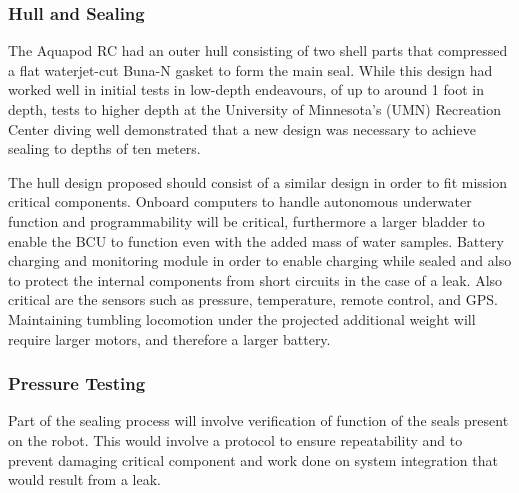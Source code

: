 


	\subsubsection{Hull and Sealing}

	The Aquapod RC had an outer hull consisting of two shell parts that compressed a flat waterjet-cut Buna-N gasket to form the main seal. While this design had worked well in initial tests in low-depth endeavours, of up to around 1 foot in depth, tests to higher depth at the University of Minnesota's (UMN) Recreation Center diving well demonstrated that a new design was necessary to achieve sealing to depths of ten meters. 

	The hull design proposed should consist of a similar design in order to fit mission critical components. Onboard computers to handle autonomous underwater function and programmability will be critical, furthermore a larger bladder to enable the BCU to function even with the added mass of water samples. Battery charging and monitoring module in order to enable charging while sealed and also to protect the internal components from short circuits in the case of a leak. Also critical are the sensors such as pressure, temperature, remote control, and GPS. Maintaining tumbling locomotion under the projected additional weight will require larger motors, and therefore a larger battery. 

	\subsubsection{Pressure Testing}
	Part of the sealing process will involve verification of function of the seals present on the robot. This would involve a protocol to ensure repeatability and to prevent damaging critical component and work done on system integration that would result from a leak. 

